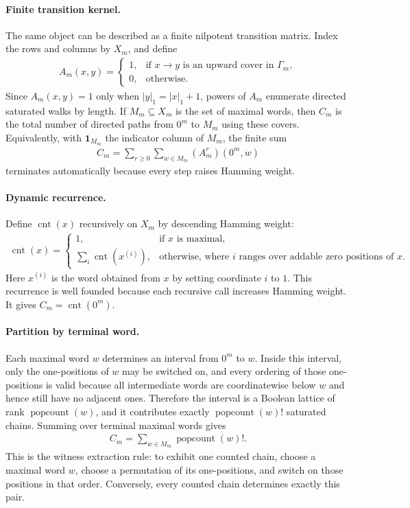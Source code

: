 \paragraph{Finite transition kernel.}
The same object can be described as a finite nilpotent transition matrix. Index the rows and columns by $X_m$, and define
$$
\begin{aligned}
A_m(x,y)=
\begin{cases}
1, & \text{if } x \to y \text{ is an upward cover in } \Gamma_m,\\
0, & \text{otherwise.}
\end{cases}
\end{aligned}
$$
Since $A_m(x,y)=1$ only when $|y|_1=|x|_1+1$, powers of $A_m$ enumerate directed saturated walks by length. If $M_m \subseteq X_m$ is the set of maximal words, then $C_m$ is the total number of directed paths from $0^m$ to $M_m$ using these covers. Equivalently, with $\mathbf{1}_{M_m}$ the indicator column of $M_m$, the finite sum
$$
\begin{aligned}
C_m=\sum_{r\geq 0} \sum_{w\in M_m} (A_m^r)(0^m,w)
\end{aligned}
$$
terminates automatically because every step raises Hamming weight.

\paragraph{Dynamic recurrence.}
Define $\operatorname{cnt}(x)$ recursively on $X_m$ by descending Hamming weight:
$$
\begin{aligned}
\operatorname{cnt}(x)=
\begin{cases}
1, & \text{if } x \text{ is maximal},\\
\sum_i \operatorname{cnt}(x^{(i)}), & \text{otherwise, where } i \text{ ranges over addable zero positions of } x.
\end{cases}
\end{aligned}
$$
Here $x^{(i)}$ is the word obtained from $x$ by setting coordinate $i$ to $1$. This recurrence is well founded because each recursive call increases Hamming weight. It gives $C_m=\operatorname{cnt}(0^m)$.

\paragraph{Partition by terminal word.}
Each maximal word $w$ determines an interval from $0^m$ to $w$. Inside this interval, only the one-positions of $w$ may be switched on, and every ordering of those one-positions is valid because all intermediate words are coordinatewise below $w$ and hence still have no adjacent ones. Therefore the interval is a Boolean lattice of rank $\operatorname{popcount}(w)$, and it contributes exactly $\operatorname{popcount}(w)!$ saturated chains. Summing over terminal maximal words gives
$$
\begin{aligned}
C_m=\sum_{w\in M_m} \operatorname{popcount}(w)!.
\end{aligned}
$$
This is the witness extraction rule: to exhibit one counted chain, choose a maximal word $w$, choose a permutation of its one-positions, and switch on those positions in that order. Conversely, every counted chain determines exactly this pair.

